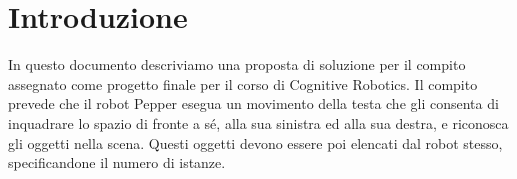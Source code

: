 \section{Introduzione}

In questo documento descriviamo una proposta di soluzione per il compito assegnato come progetto finale per il corso di Cognitive Robotics. Il compito prevede che il robot Pepper esegua un movimento della testa che gli consenta di inquadrare lo spazio di fronte a sé, alla sua sinistra ed alla sua destra, e riconosca gli oggetti nella scena. Questi oggetti devono essere poi elencati dal robot stesso, specificandone il numero di istanze.